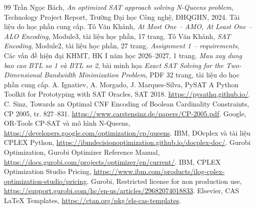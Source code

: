 \documentclass[a4paper,fleqn]{cas-sc}
\begin{document}
\begin{thebibliography}{99}
 Trần Ngọc Bách, \emph{An optimized SAT approach solving N-Queens problem},
Technology Project Report, Trường Đại học Công nghệ, ĐHQGHN, 2024. Tài liệu do học phần cung cấp.
 Tô Văn Khánh, \emph{At Most One -- AMO, At Least One -- ALO Encoding},
Module3, tài liệu học phần, 17 trang.
 Tô Văn Khánh, \emph{SAT Encoding}, Module2, tài liệu học phần, 27 trang.
 \emph{Assignment 1 -- requirements}, Các vấn đề hiện đại KHMT,
HK I năm học 2026--2027, 1 trang.
 \emph{Mau xay dung bao cao BTL so 1 và BTL so 2},
bài minh họa \emph{Exact SAT Solving for the Two-Dimensional Bandwidth Minimization Problem},
PDF 32 trang, tài liệu do học phần cung cấp.
 A. Ignatiev, A. Morgado, J. Marques-Silva,
PySAT A Python Toolkit for Prototyping with SAT Oracles, SAT 2018.
\url{https://pysathq.github.io/}.
 C. Sinz, Towards an Optimal CNF Encoding of Boolean Cardinality Constraints,
CP 2005, tr. 827--831. \url{https://www.carstensinz.de/papers/CP-2005.pdf}.
 Google, OR-Tools CP-SAT và mô hình N-Queens,
\url{https://developers.google.com/optimization/cp/queens}.
 IBM, DOcplex và tài liệu CPLEX Python,
\url{https://ibmdecisionoptimization.github.io/docplex-doc/}.
 Gurobi Optimization, Gurobi Optimizer Reference Manual,
\url{https://docs.gurobi.com/projects/optimizer/en/current/}.
 IBM, CPLEX Optimization Studio Pricing,
\url{https://www.ibm.com/products/ilog-cplex-optimization-studio/pricing}.
 Gurobi, Restricted license for non production use,
\url{https://support.gurobi.com/hc/en-us/articles/29682074018833}.
 Elsevier, CAS LaTeX Templates,
\url{https://ctan.org/pkg/els-cas-templates}.
\end{thebibliography}
\end{document}
